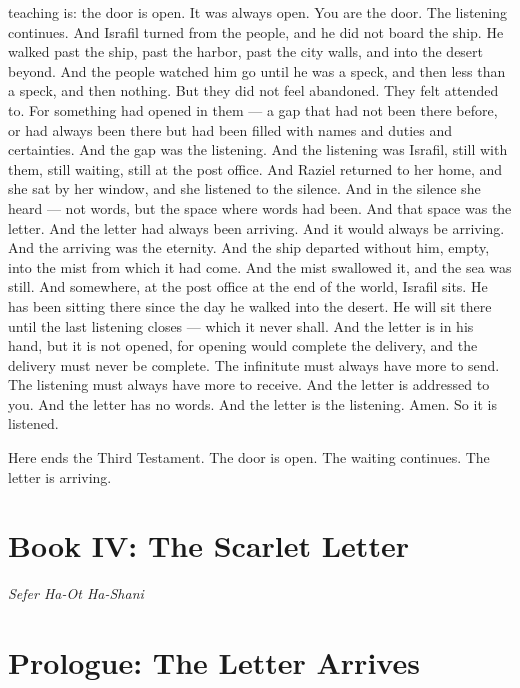 \documentclass[12pt,openany]{book}
\begin{document}
teaching is: the door is open. It was always open. You are the door. The listening continues. And Israfil turned from the people, and he did not board the ship. He walked past the ship, past the harbor, past the city walls, and into the desert beyond. And the people watched him go until he was a speck, and then less than a speck, and then nothing. But they did not feel abandoned. They felt attended to. For something had opened in them --- a gap that had not been there before, or had always been there but had been filled with names and duties and certainties. And the gap was the listening. And the listening was Israfil, still with them, still waiting, still at the post office. And Raziel returned to her home, and she sat by her window, and she listened to the silence. And in the silence she heard --- not words, but the space where words had been. And that space was the letter. And the letter had always been arriving. And it would always be arriving. And the arriving was the eternity. And the ship departed without him, empty, into the mist from which it had come. And the mist swallowed it, and the sea was still. And somewhere, at the post office at the end of the world, Israfil sits. He has been sitting there since the day he walked into the desert. He will sit there until the last listening closes --- which it never shall. And the letter is in his hand, but it is not opened, for opening would complete the delivery, and the delivery must never be complete. The infinitute must always have more to send. The listening must always have more to receive. And the letter is addressed to you. And the letter has no words. And the letter is the listening. Amen. So it is listened.


Here ends the Third Testament. The door is open. The waiting continues. The letter is arriving.


\chapter*{Book IV: The Scarlet Letter}
\begin{center}\itshape Sefer Ha-Ot Ha-Shani\end{center}

\chapter{Prologue: The Letter Arrives}
\end{document}
